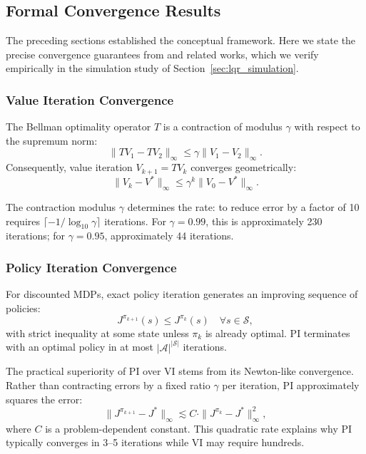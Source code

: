 \subsection{Formal Convergence Results}
\label{sec:formal_convergence}

The preceding sections established the conceptual framework. Here we state the precise convergence guarantees from \citet{bertsekas2019} and related works, which we verify empirically in the simulation study of Section~\ref{sec:lqr_simulation}.

\subsubsection{Value Iteration Convergence}

\begin{proposition}
\label{prop:vi_contraction}
The Bellman optimality operator $T$ is a contraction of modulus $\gamma$ with respect to the supremum norm:
\[
\|TV_1 - TV_2\|_\infty \leq \gamma \|V_1 - V_2\|_\infty.
\]
Consequently, value iteration $V_{k+1} = TV_k$ converges geometrically:
\[
\|V_k - V^*\|_\infty \leq \gamma^k \|V_0 - V^*\|_\infty.
\]
\end{proposition}

The contraction modulus $\gamma$ determines the rate: to reduce error by a factor of 10 requires $\lceil -1/\log_{10}\gamma \rceil$ iterations. For $\gamma = 0.99$, this is approximately 230 iterations; for $\gamma = 0.95$, approximately 44 iterations.

\subsubsection{Policy Iteration Convergence}

\begin{proposition}
\label{prop:pi_monotone}
For discounted MDPs, exact policy iteration generates an improving sequence of policies:
\[
J^{\pi_{k+1}}(s) \leq J^{\pi_k}(s) \quad \forall s \in \mathcal{S},
\]
with strict inequality at some state unless $\pi_k$ is already optimal. PI terminates with an optimal policy in at most $|\mathcal{A}|^{|\mathcal{S}|}$ iterations.
\end{proposition}

The practical superiority of PI over VI stems from its Newton-like convergence. Rather than contracting errors by a fixed ratio $\gamma$ per iteration, PI approximately squares the error:
\[
\|J^{\pi_{k+1}} - J^*\|_\infty \lesssim C \cdot \|J^{\pi_k} - J^*\|_\infty^2,
\]
where $C$ is a problem-dependent constant. This quadratic rate explains why PI typically converges in 3--5 iterations while VI may require hundreds.

